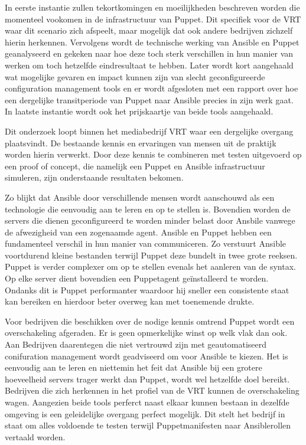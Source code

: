 In eerste instantie zullen tekortkomingen en moeilijkheden beschreven worden die momenteel vookomen in de infrastructuur van Puppet. Dit specifiek voor de VRT waar dit scenario zich afspeelt, maar mogelijk dat ook andere bedrijven zichzelf hierin herkennen. Vervolgens wordt de technische werking van Ansible en Puppet geanalyseerd en gekeken naar hoe deze toch sterk verschillen in hun manier van werken om toch hetzelfde eindresultaat te hebben. Later wordt kort aangehaald wat mogelijke gevaren en impact kunnen zijn van slecht geconfigureerde configuration management tools en er wordt afgesloten met een rapport over hoe een dergelijke transitperiode van Puppet naar Ansible precies in zijn werk gaat. In laatste instantie wordt ook het prijskaartje van beide tools aangehaald.

Dit onderzoek loopt binnen het mediabedrijf VRT waar een dergelijke overgang plaatsvindt. De bestaande kennis en ervaringen van mensen uit de praktijk worden hierin verwerkt. Door deze kennis te combineren met testen uitgevoerd op een proof of concept, die namelijk een Puppet en Ansible infrastructuur simuleren, zijn onderstaande resultaten bekomen.

Zo blijkt dat Ansible door verschillende mensen wordt aanschouwd als een technologie die eenvoudig aan te leren en op te stellen is. Bovendien worden de servers die dienen geconfigureerd te worden minder belast door Ansbile vanwege de afwezigheid van een zogenaamde agent. Ansible en Puppet hebben een fundamenteel verschil in hun manier van communiceren. Zo verstuurt Ansible voortdurend kleine bestanden terwijl Puppet deze bundelt in twee grote reeksen. Puppet is verder complexer om op te stellen evenals het aanleren van de syntax. Op elke server dient bovendien een Puppetagent ge\"installeerd te worden. Ondanks dit is Puppet performanter waardoor hij sneller een consistente staat kan bereiken en hierdoor beter overweg kan met toenemende drukte.

Voor bedrijven die beschikken over de nodige kennis omtrend Puppet wordt een overschakeling afgeraden. Er is geen opmerkelijke winst op welk vlak dan ook. Aan Bedrijven daarentegen die niet vertrouwd zijn met geautomatiseerd conifuration management  wordt geadviseerd om voor Ansible te kiezen. Het is eenvoudig aan te leren en niettemin het feit dat Ansible bij een grotere hoeveelheid servers trager werkt dan Puppet, wordt wel hetzelfde doel bereikt. Bedrijven die zich herkennen in het profiel van de VRT kunnen de overschakeling wagen. Aangezien beide tools perferct naast elkaar kunnen bestaan in dezelfde omgeving is een geleidelijke overgang perfect mogelijk. Dit stelt het bedrijf in staat om alles voldoende te testen terwijl Puppetmanifesten naar Ansiblerollen vertaald worden.


